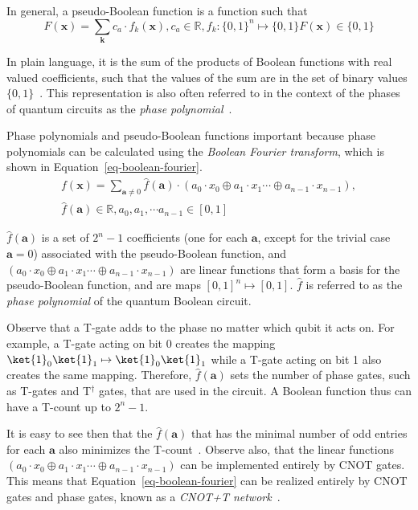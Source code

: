 \documentclass[a4paper]{article}
\begin{document}
In general, a pseudo-Boolean function is a function such that
\begin{equation}
  \label{eq-pseudo-boolean}
  F(\mathbf{x}) = \sum_{\mathbf{k}} c_a \cdot f_k(\mathbf{x}), c_a \in \mathbb{R}, f_k : \{0,1\}^n \mapsto \{0,1\}
  F(\mathbf{x}) \in \{0,1\}
\end{equation}

In plain language, it is the sum of the products of Boolean functions with real valued coefficients, such that
the values of the sum are in the set of binary values $\{0,1\}$~\cite{bib-barenco-elementary}. This
representation is also often referred to in the context of the phases of quantum circuits as the
{\it phase polynomial}~\cite{bib-amy-cnot}.

Phase polynomials and pseudo-Boolean functions important because phase polynomials can be calculated
using the {\it Boolean Fourier transform}, which is shown in Equation~\ref{eq-boolean-fourier}.
\begin{equation}
  \label{eq-boolean-fourier}
  \begin{aligned}
    f(\mathbf{x}) = \sum_{\mathbf{a} \neq 0} \hat{f}(\mathbf{a}) \cdot ( a_0 \cdot x_0 \oplus a_1 \cdot x_1 \cdots \oplus a_{n-1} \cdot x_{n-1}),\\\nonumber
    \hat{f}(\mathbf{a}) \in \mathbb{R} , a_0,a_1,\cdots a_{n-1} \in [0,1]
  \end{aligned}
\end{equation}

$\hat{f}(\mathbf{a})$ is a set of $2^{n}-1$ coefficients (one for each $\mathbf{a}$, except for the trivial
case $\mathbf{a} = 0$) associated with the pseudo-Boolean function, and
$( a_0 \cdot x_0 \oplus a_1 \cdot x_1 \cdots \oplus a_{n-1} \cdot x_{n-1}) $ are linear functions
that form a basis for the pseudo-Boolean function, and are maps $[0,1]^n \mapsto [0,1]$. $\hat{f}$ is referred to
as the {\it phase polynomial} of the quantum Boolean circuit.

Observe that a T-gate adds to the phase no matter which qubit it acts on.
For example, a T-gate acting on bit 0 creates the mapping $\ket{1}_0\ket{1}_1 \mapsto \ket{1}_0\ket{1}_1$ while
a T-gate acting on bit 1 also creates the same mapping. Therefore, $\hat{f}(\mathbf{a})$ sets the number of
phase gates, such as T-gates and T$^{\dagger}$ gates, that are used in the circuit. A Boolean function thus can
have a T-count up to $2^{n}-1$.

It is easy to see then that the $\hat{f}(\mathbf{a})$ that has the minimal number of odd entries for each
$\mathbf{a}$ also minimizes the T-count~\cite{bib-amy-rm}. Observe also, that the linear functions
$( a_0 \cdot x_0 \oplus a_1 \cdot x_1 \cdots \oplus a_{n-1} \cdot x_{n-1}) $ can be implemented
entirely by CNOT gates. This means that Equation~\ref{eq-boolean-fourier} can be realized entirely by
CNOT gates and phase gates, known as a {\it CNOT+T network}~\cite{bib-amy-cnot}. 
\end{document}
